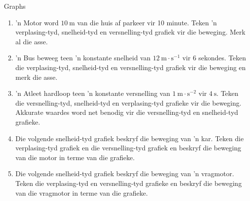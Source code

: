     \noindent
   \label{m38795*secfhsst!!!underscore!!!id3332}
\begin{exercises}{Graphs}
            \nopagebreak \noindent

\begin{enumerate}[noitemsep, label=\textbf{\arabic*}. ] 
    \item 'n Motor word $10~\text{m}$ van die huis af parkeer vir 10 minute. Teken 'n verplasing-tyd, snelheid-tyd en versnelling-tyd grafiek vir die beweging. Merk al die asse.

    \item 'n Bus beweeg teen 'n konstante snelheid van $12~\text{m}\ensuremath{\cdot}\text{s}{}^{-1}$ vir 6 sekondes. Teken die verplasing-tyd, snelheid-tyd en versnelling-tyd grafiek vir die beweging en merk die asse.

    \item 'n Atleet hardloop teen 'n konstante versnelling van $1~\text{m}\ensuremath{\cdot}\text{s}{}^{-2}$ vir $4~\text{s}$. Teken die versnelling-tyd, snelheid-tyd en verplasing-tyd grafieke vir die beweging. Akkurate waardes word net benodig vir die versnelling-tyd en snelheid-tyd grafieke. 

    \item Die volgende snelheid-tyd grafiek beskryf die beweging van 'n kar. Teken die verplasing-tyd grafiek en die versnelling-tyd grafiek en beskryf die beweging van die motor in terme van die grafieke. 
\begin{figure}[H] %
\begin{center}
\end{center}

\end{figure}   

\item Die volgende snelheid-tyd grafiek beskryf die beweging van 'n vragmotor. Teken die verplasing-tyd en versnelling-tyd grafieke en beskryf die beweging van die vragmotor in terme van die grafieke.
\begin{figure}[H] %
\begin{center}
\end{center}
 \end{figure}               \end{enumerate}



\end{exercises}
